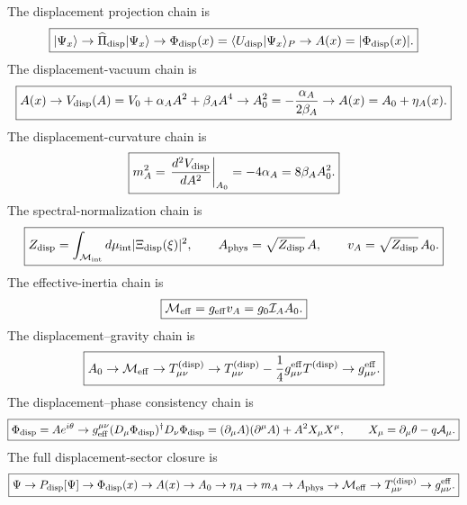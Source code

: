 \documentclass[11pt]{article}
\begin{document}
The displacement projection chain is
\begin{equation}
\boxed{
|\Psi_x\rangle
\rightarrow
\widehat{\Pi}_{\rm disp}|\Psi_x\rangle
\rightarrow
\Phi_{\rm disp}(x)
=
\langle U_{\rm disp}|\Psi_x\rangle_P
\rightarrow
A(x)
=
|\Phi_{\rm disp}(x)|.
}
\end{equation}
The displacement-vacuum chain is
\begin{equation}
\boxed{
A(x)
\rightarrow
V_{\rm disp}(A)
=
V_0+\alpha_AA^2+\beta_AA^4
\rightarrow
A_0^2
=
-\frac{\alpha_A}{2\beta_A}
\rightarrow
A(x)=A_0+\eta_A(x).
}
\end{equation}
The displacement-curvature chain is
\begin{equation}
\boxed{
m_A^2
=
\left.
\frac{d^2V_{\rm disp}}{dA^2}
\right|_{A_0}
=
-4\alpha_A
=
8\beta_AA_0^2.
}
\end{equation}
The spectral-normalization chain is
\begin{equation}
\boxed{
Z_{\rm disp}
=
\int_{\mathcal M_{\rm int}}
d\mu_{\rm int}
|\Xi_{\rm disp}(\xi)|^2,
\qquad
A_{\rm phys}
=
\sqrt{Z_{\rm disp}}\,A,
\qquad
v_A
=
\sqrt{Z_{\rm disp}}\,A_0.
}
\end{equation}
The effective-inertia chain is
\begin{equation}
\boxed{
\mathcal M_{\rm eff}
=
g_{\rm eff}v_A
=
g_0\mathcal I_AA_0.
}
\end{equation}
The displacement--gravity chain is
\begin{equation}
\boxed{
A_0
\rightarrow
\mathcal M_{\rm eff}
\rightarrow
T_{\mu\nu}^{({\rm disp})}
\rightarrow
T_{\mu\nu}^{({\rm disp})}
-
\frac14
g_{\mu\nu}^{\rm eff}
T^{({\rm disp})}
\rightarrow
g_{\mu\nu}^{\rm eff}.
}
\end{equation}
The displacement--phase consistency chain is
\begin{equation}
\boxed{
\Phi_{\rm disp}=Ae^{i\theta}
\rightarrow
g_{\rm eff}^{\mu\nu}
(D_\mu\Phi_{\rm disp})^\dagger D_\nu\Phi_{\rm disp}
=
(\partial_\mu A)(\partial^\mu A)
+
A^2X_\mu X^\mu,
\qquad
X_\mu=\partial_\mu\theta-q\mathcal A_\mu.
}
\end{equation}
The full displacement-sector closure is
\begin{equation}
\boxed{
\Psi
\rightarrow
P_{\rm disp}[\Psi]
\rightarrow
\Phi_{\rm disp}(x)
\rightarrow
A(x)
\rightarrow
A_0
\rightarrow
\eta_A
\rightarrow
m_A
\rightarrow
A_{\rm phys}
\rightarrow
\mathcal M_{\rm eff}
\rightarrow
T_{\mu\nu}^{({\rm disp})}
\rightarrow
g_{\mu\nu}^{\rm eff}.
}
\end{equation}
\end{document}
